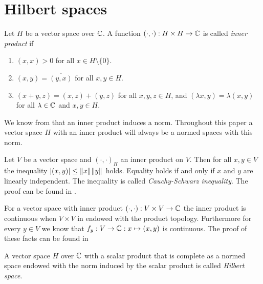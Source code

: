 \section{Hilbert spaces}

\begin{definition}
	Let $H$ be a vector space over $\mathbb{C}$. A function $(\cdot, \cdot): H \times H \to \mathbb{C}$ is called \textit{inner product} if 
	\begin{enumerate}
		\item $(x,x) > 0$ for all $x \in H \setminus \{0\}$.
		\item $(x,y) = \overline{(y,x)}$ for all $x,y \in H$.
		\item $(x + y, z) = (x,z) + (y,z)$ for all $x,y,z \in H$, and $(\lambda x, y) = \lambda (x,y)$ for all $\lambda \in \mathbb{C}$ and $x,y \in H$. 
	\end{enumerate}
\end{definition}


\begin{remark}
	We know from \cite[p.41]{FAna1} that an inner product induces a norm. Throughout this paper a vector space $H$ with an inner product will always be a normed spaces with this norm.
\end{remark}


\begin{remark} \label{remark:csb}
	Let $V$ be a vector space and $(\cdot, \cdot)_H$ an inner product on $V$. Then for all $x,y \in V$ the inequality ${\left | (x,y) \right |} \leq {\left \| x \right \|}_{} {\left \| y \right \|}_{}$ holds. Equality holds if and only if $x$ and $y$ are linearly independent. The inequality is called \textit{Cauchy-Schwarz inequality}. The proof can be found in \cite[p. 41]{FAna1}.
\end{remark}


\begin{remark}
	For a vector space with inner product $(\cdot, \cdot): V \times V \to \mathbb{C}$ the inner product is continuous when $V \times V$ in endowed with the product topology. Furthermore for every $y \in V$ we know that $f_y:V \to \mathbb{C}: x \mapsto (x,y)$ is continuous. The proof of these facts can be found in \cite[p.43]{FAna1} 
\end{remark}

\begin{definition}
	A vector space $H$ over $\mathbb{C}$ with a scalar product that is complete as a normed space endowed with the norm induced by the scalar product is called \textit{Hilbert space}.
\end{definition}

